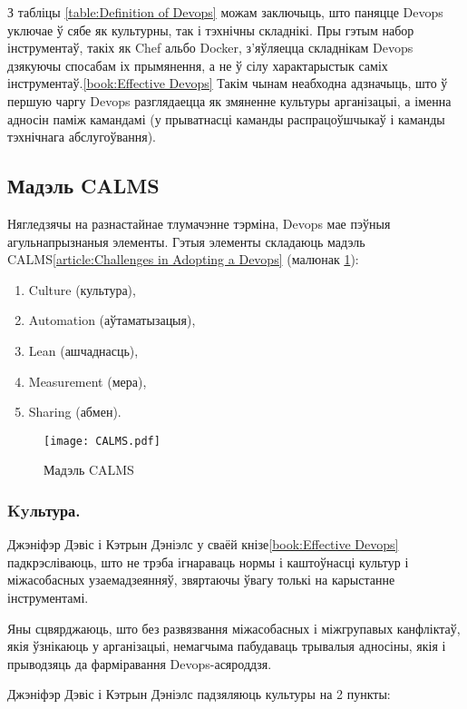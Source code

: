 З табліцы \ref{table:Definition of Devops} можам заключыць,
што паняцце Devops уключае ў сябе як культурны, так і
тэхнічны складнікі.
Пры гэтым набор інструментаў, такіх як Chef альбо Docker,
з'яўляецца складнікам Devops дзякуючы спосабам іх прымянення,
а не ў сілу характарыстык саміх інструментаў.\ref{book:Effective Devops}
Такім чынам неабходна адзначыць, што ў першую чаргу Devops разглядаецца
як змяненне культуры арганізацыі,
а іменна адносін паміж камандамі (у прыватнасці каманды распрацоўшчыкаў і
каманды тэхнічнага абслугоўвання).

\subsection{Мадэль CALMS}

Нягледзячы на разнастайнае тлумачэнне тэрміна, Devops мае
пэўныя агульнапрызнаныя элементы.
Гэтыя элементы складаюць мадэль CALMS\ref{article:Challenges in Adopting a Devops} (малюнак \ref{fig:CALMS model}):
\begin{enumerate}
    \item Culture (культура),
    \item Automation (аўтаматызацыя),
    \item Lean (ашчаднасць),
    \item Measurement (мера),
    \item Sharing (абмен).
\end{enumerate}

\begin{figure}[h!]
    \texttt{[image: CALMS.pdf]}
    \caption{Мадэль CALMS}
    \label{fig:CALMS model}
\end{figure}

\vspace{-\baselineskip}
\subsubsection{Kyльтура.}

Джэніфэр Дэвіс і Кэтрын Дэніэлс у сваёй кнізе\ref{book:Effective Devops}
падкрэсліваюць, што не трэба ігнараваць нормы і каштоўнасці
культур і міжасобасных узаемадзеянняў, звяртаючы ўвагу толькі
на карыстанне інструментамі.

Яны сцвярджаюць, што без развязвання міжасобасных і
міжгрупавых канфліктаў, якія ўзнікаюць у арганізацыі,
немагчыма пабудаваць трывалыя адносіны, якія і прыводзяць
да фар\-мі\-ра\-ван\-ня Devops-асяроддзя.

Джэніфэр Дэвіс і Кэтрын Дэніэлс падзяляюць культуры на 2 пункты:

